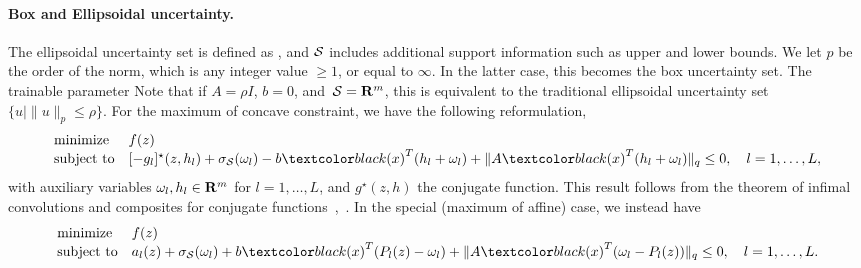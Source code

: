\paragraph{Box and Ellipsoidal uncertainty.}
The ellipsoidal uncertainty set is defined as
, and $\mathcal{S}$ includes additional support information such as upper and lower bounds. We let $p$ be the order of the norm, which is any integer value $\geq 1$, or equal to $\infty$. In the latter case, this becomes the box uncertainty set. The trainable parameter  Note that if $A = \rho I$, $b = 0$, and~$\mathcal{S} = {\mathbf R}^m$, this is equivalent to the traditional ellipsoidal uncertainty set ${ \{ u \mid\| u\|_p \leq \rho \}}$. 
For the maximum of concave constraint, we have the following reformulation,
\begin{equation*}
	\begin{array}{ll}
	\text{minimize} & f(z)\\
	\mbox{subject to} & [-g_l]^\star(z,h_l)+ \sigma_\supp(\omega_l)  -b\RC{(x)}^T(h_l + \omega_l) + \|A\RC{(x)}^T(h_l + \omega_l) \|_q \leq 0, \quad l = 1,\dots,L,
	\end{array}
	\end{equation*}
with auxiliary variables $\omega_l, h_l \in {\mathbf R}^m$ for $l = 1,\dots,L$, and $g^\star(z,h)$ the conjugate function. This result follows from the theorem of infimal convolutions and composites for conjugate functions~\citep{rockafellar_wets_1998},~\citep{composites}. In the special (maximum of affine) case, we instead have
\begin{equation*}
	\label{eq:ellip_max}
	\begin{array}{ll}
		\mbox{minimize} & f(z)\\
		\mbox{subject to} & a_l(z) + \sigma_\supp(\omega_l)+ b\RC{(x)}^T(P_l(z) - \omega_l) +  \|A\RC{(x)}^T(\omega_l -P_l(z))\|_q \le 0, \quad l = 1,\dots,L.	\end{array}
\end{equation*}

